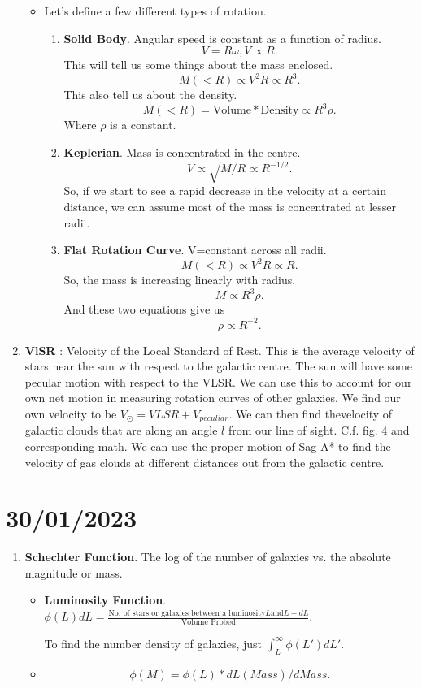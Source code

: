 \documentclass[a4paper]{article}
\begin{document}
\begin{enumerate}
\begin{itemize}
  \item Let's define a few different types of rotation.
    \begin{enumerate}
      \item {\bf Solid Body}. Angular speed is constant as a function of radius. \[
      V=R\omega, V\propto R
      .\] This will tell us some things about the mass enclosed.\[
      M(<R)\propto V^{2}R\propto R^{3}
      .\] This also tell us about the density.\[
      M(<R)=\text{Volume}*\text{Density}\propto R^{3}\rho
      .\] Where $\rho$ is a constant.
    \item {\bf Keplerian}. Mass is concentrated in the centre.\[
        V\propto\sqrt{M/R}\propto R^{-1/2}
    .\] So, if we start to see a rapid decrease in the velocity at a certain distance, we can assume most of the mass is concentrated at lesser radii.
  \item {\bf Flat Rotation Curve}. V=constant across all radii.\[
  M(<R)\propto V^{2}R \propto R
  .\] So, the mass is increasing linearly with radius. \[
  M \propto R^{3}\rho
  .\] And these two equations give us \[
  \rho \propto R^{-2}
  .\] 
    \end{enumerate}
\end{itemize}
\item {\bf VlSR} : Velocity of the Local Standard of Rest. This is the average velocity of stars near the sun with respect to the galactic centre. The sun will have some pecular motion with respect to the VLSR. We can use this to account for our own net motion in measuring rotation curves of other galaxies.
  We find our own velocity to be $V_{\odot}=VLSR+V_{peculiar}$. We can then find thevelocity of galactic clouds that are along an angle $l$ from our line of sight. C.f. fig. 4 and corresponding math.
  We can use the proper motion of Sag A* to find the velocity of gas clouds at different distances out from the galactic centre.
\end{enumerate}
\section{30/01/2023}
\begin{enumerate}
  \item {\bf Schechter Function}. The log of the number of galaxies vs. the absolute magnitude or mass.
    \begin{itemize}
      \item {\bf Luminosity Function}. $\phi(L)dL=\frac{\text{No. of stars or galaxies between a luminosity} L \text{and} L+dL}{\text{Volume Probed}}$. 

        To find the number density of galaxies, just $\int_{L}^{\infty}\phi(L')dL'$. 
      \item \[
      \phi(M) = \phi(L) * dL(Mass)/dMass

      .\] 


    \end{itemize}
\end{enumerate}
\end{document}
